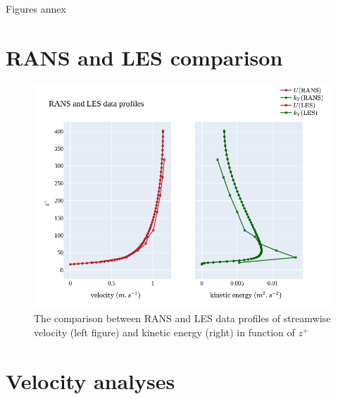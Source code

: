 \documentclass[]{article}
\theoremstyle{plain}
\theoremstyle{remark}
\begin{document}
\begin{center} 
	\huge Figures annex
\end{center}

\section{RANS and LES comparison}

\begin{figure}[h]
	\begin{center}
	\includegraphics[width=\textwidth]{../output/channel_wrles_retau395/RANS/RANS_profiles.png}
	\caption{The comparison between RANS and LES data profiles of streamwise velocity (left figure) and kinetic energy (right) in function of $z^+$}
	\end{center}
\end{figure}



\section{Velocity analyses}
\end{document}
